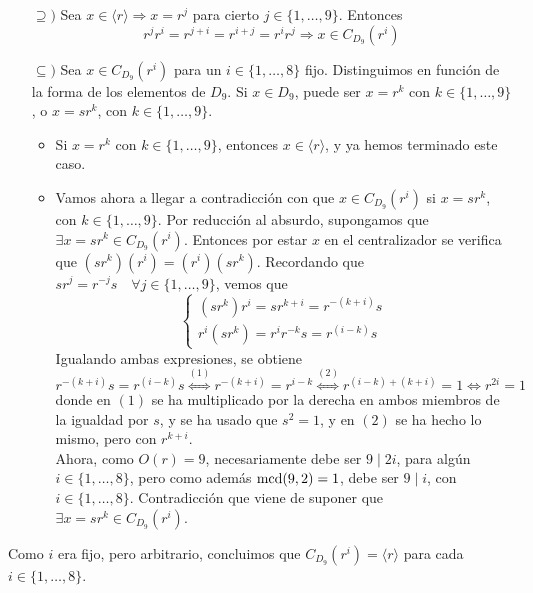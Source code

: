 \documentclass[12pt]{article}
\begin{document}
\begin{ejercicio}
\begin{enumerate}[label=(\alph*)]
            \begin{itemize}
                \item[$\supseteq)$] Sea $x \in \langle r \rangle \Longrightarrow x = r^j$ para cierto $j \in \{1, \ldots, 9\}$. Entonces $$r^{j}r^{i} = r^{j+i} = r^{i+j} = r^{i}r^{j} \Longrightarrow x \in C_{D_9}(r^i)$$
                \item[$\subseteq)$] Sea $x \in C_{D_9}(r^i)$ para un $i \in \{1, \ldots, 8\}$ fijo. Distinguimos en función de la forma de los elementos de $D_9$. Si $x \in D_9$, puede ser $x = r^k$ con $k \in \{1, \ldots, 9\}$, o $x = sr^k$, con $k \in \{1, \ldots, 9\}$.
                \begin{itemize}
                    \item Si $x = r^k$ con $k \in \{1, \ldots, 9\}$, entonces $x \in \langle r \rangle$, y ya hemos terminado este caso.
                    \item Vamos ahora a llegar a contradicción con que $x \in C_{D_9}(r^i)$ si $x = sr^k$, con $k \in \{1, \ldots, 9\}$. Por reducción al absurdo, supongamos que $\exists x = sr^k \in C_{D_9}(r^i)$. Entonces por estar $x$ en el centralizador se verifica que $(sr^k)(r^i) = (r^i)(sr^k)$.
                    Recordando que $sr^j = r^{-j} s \quad \forall j \in \{1, \ldots, 9\}$, vemos que $$\begin{cases}
                        (sr^k)r^i = sr^{k+i} = r^{-(k+i)}s \\
                        r^i(sr^k) = r^i r^{-k} s = r^{(i-k)}s
                    \end{cases}$$
                    Igualando ambas expresiones, se obtiene $$r^{-(k+i)} s = r^{(i-k)}s \stackrel{(1)}{\iff} r^{-(k+i)} = r^{i-k} \stackrel{(2)}{\iff} r^{(i-k) + (k+i)} = 1 \iff r^{2i} = 1$$
                    donde en $(1)$ se ha multiplicado por la derecha en ambos miembros de la igualdad por $s$, y se ha usado que $s^2 = 1$, y en $(2)$ se ha hecho lo mismo, pero con $r^{k+i}$. \\
                    
                    Ahora, como $O(r) = 9$, necesariamente debe ser $9 \mid 2i$, para algún $i \in \{1, \ldots, 8\}$, pero como además $\operatorname{mcd}(9,2) = 1$, debe ser $9 \mid i$, con $i \in \{1, \ldots, 8\}$. Contradicción que viene de suponer que $\exists x = sr^k \in C_{D_9}(r^i)$.
                \end{itemize}  
            \end{itemize}

            Como $i$ era fijo, pero arbitrario, concluimos que $C_{D_9}(r^i) = \langle r \rangle$ para cada $i \in \{1, \ldots, 8\}$.


\end{enumerate}
\end{ejercicio}
\end{document}
